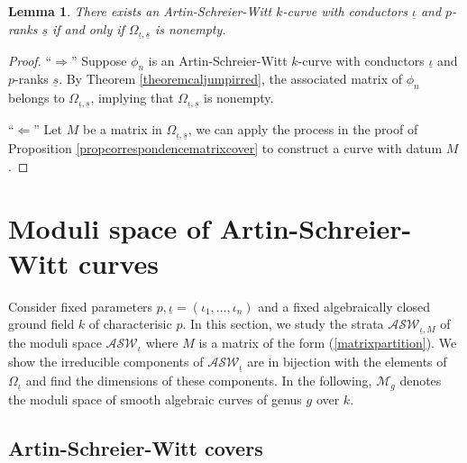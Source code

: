 \documentclass{compositio}
\newtheorem{lemma}[theorem]{Lemma}
\theoremstyle{remark}
\theoremstyle{remark}
\begin{document}
\begin{lemma}
There exists an Artin-Schreier-Witt $k$-curve with conductors $\underline{\iota}$ and $p$-ranks $\underline{s}$ if and only if $\Omega_{\underline{\iota}, \underline{s}}$ is nonempty.
\end{lemma}

\begin{proof}
``$ \Rightarrow$'' Suppose $\phi_n$ is an Artin-Schreier-Witt $k$-curve with conductors $\underline{\iota}$ and $p$-ranks $\underline{s}$. By Theorem \ref{theoremcaljumpirred}, the associated matrix of $\phi_n$ belongs to $\Omega_{\underline{\iota}, \underline{s}}$, implying that $\Omega_{\underline{\iota}, \underline{s}}$ is nonempty.

``$ \Leftarrow$'' Let $M$ be a matrix in $\Omega_{\underline{\iota}, \underline{s}}$, we can apply the process in the proof of Proposition \ref{propcorrespondencematrixcover} to construct a curve with datum $M$.
\end{proof}




\section{Moduli space of Artin-Schreier-Witt curves}
\label{secmodulispace}

Consider fixed parameters $p, \underline{\iota}=(\iota_1, \ldots, \iota_n)$ and a fixed algebraically closed ground field $k$ of characterisic $p$. In this section, we study the strata $\mathcal{ASW}_{\underline{\iota},M}$ of the moduli space $\mathcal{ASW}_{\underline{\iota}}$ where $M$ is a matrix of the form (\ref{matrixpartition}). We show the irreducible components of $\mathcal{ASW}_{\underline{\iota}}$ are in bijection with the elements of $\Omega_{\underline{\iota}}$ and find the dimensions of these components. In the following, $\mathcal{M}_{g}$ denotes the moduli space of smooth algebraic curves of genus $g$ over $k$.

\subsection{Artin-Schreier-Witt covers} 
\end{document}
